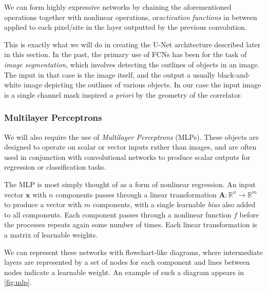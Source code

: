 \documentclass[12pt]{article}
\begin{document}
We can form highly expressive networks by chaining the aforementioned operations together with nonlinear operations, or\textit{activation functions} in between applied
to each pixel/site in the layer outputted by the previous convolution.

This is exactly what we will do in creating the U-Net architecture described later in this section. In the past, the primary use of FCNs has been for the task 
of \textit{image segmentation}, which involves detecting the outlines of objects in an image. The input in that case is the image itself, and the output
a usually black-and-white image depicting the outlines of various objects. In our case the input image is a single channel mask inspired \textit{a priori}
by the geometry of the correlator.

\subsubsection{Multilayer Perceptrons}

We will also require the use of \textit{Multilayer Perceptrons} (MLPs). These objects are designed to operate on scalar or vector inputs
rather than images, and are often used in conjunction with convolutional networks to produce scalar outputs for regression or classification tasks.

The MLP is most simply thought of as a form of nonlinear regression. An input vector $\mathbf{x}$ with $n$ components passes through a linear
transformation $\mathbf{A}:\mathbb{R}^n\to \mathbb{R}^m$ to produce a vector with $m$ components, with a single learnable \textit{bias} also added to all components. Each component passes through a nonlinear function $f$ 
before the processes repeats again some number of times. Each linear transformation is a matrix of learnable weights. 

We can represent these networks with flowchart-like diagrams, where intermediate layers are represented by a set of nodes for each component and lines between nodes
indicate a learnable weight. An example of such a diagram appears in \ref{fig:mlp}.
\end{document}
